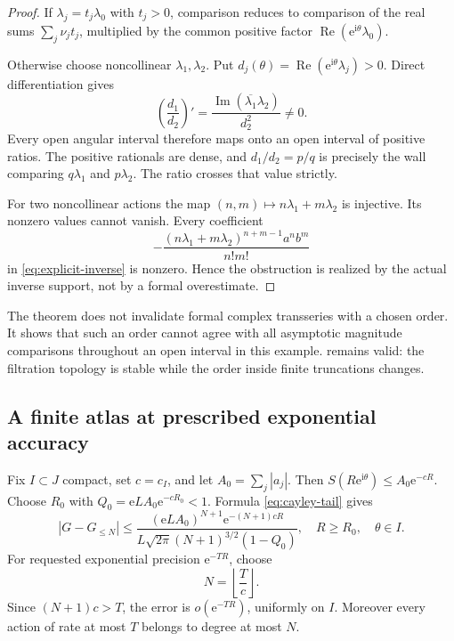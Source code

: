 \documentclass[11pt,a4paper]{article}
\numberwithin{equation}{section}
\theoremstyle{definition}
\theoremstyle{remark}
\newcommand{\ii}{\mathrm i}
\newcommand{\e}{\mathrm e}
\newcommand{\Rea}{\operatorname{Re}}
\newcommand{\Ima}{\operatorname{Im}}
\begin{document}
\begin{proof}
If $\lambda_j=t_j\lambda_0$ with $t_j>0$, comparison reduces to comparison
of the real sums $\sum_j\nu_jt_j$, multiplied by the common positive
factor $\Rea(\e^{\ii\theta}\lambda_0)$.

Otherwise choose noncollinear $\lambda_1,\lambda_2$. Put
$d_j(\theta)=\Rea(\e^{\ii\theta}\lambda_j)>0$. Direct differentiation gives
\begin{equation}\label{eq:ratio-derivative}
 \left(\frac{d_1}{d_2}\right)'=
 \frac{\Ima(\overline{\lambda_1}\lambda_2)}{d_2^2}\ne0.
\end{equation}
Every open angular interval therefore maps onto an open interval of
positive ratios. The positive rationals are dense, and $d_1/d_2=p/q$
is precisely the wall comparing $q\lambda_1$ and $p\lambda_2$.
The ratio crosses that value strictly.

For two noncollinear actions the map $(n,m)\mapsto n\lambda_1+m\lambda_2$
is injective. Its nonzero values cannot vanish. Every coefficient
\[
 -\frac{(n\lambda_1+m\lambda_2)^{n+m-1}a^n b^m}{n!m!}
\]
in \eqref{eq:explicit-inverse} is nonzero. Hence the obstruction is
realized by the actual inverse support, not by a formal overestimate.
\end{proof}

The theorem does not invalidate formal complex transseries with a chosen
order. It shows that such an order cannot agree with all asymptotic
magnitude comparisons throughout an open interval in this example.
 remains valid: the filtration topology is stable
while the order inside finite truncations changes.

\subsection{A finite atlas at prescribed exponential accuracy}

Fix $I\subset J$ compact, set $c=c_I$, and let $A_0=\sum_j|a_j|$.
Then $S(R\e^{\ii\theta})\le A_0\e^{-cR}$. Choose $R_0$ with
$Q_0=\e L A_0\e^{-cR_0}<1$. Formula \eqref{eq:cayley-tail} gives
\begin{equation}\label{eq:uniform-exp-tail}
 |G-G_{\le N}|\le
 \frac{(\e L A_0)^{N+1}\e^{-(N+1)cR}}
 {L\sqrt{2\pi}(N+1)^{3/2}(1-Q_0)},
 \quad R\ge R_0,\quad\theta\in I.
\end{equation}
For requested exponential precision $\e^{-TR}$, choose
\begin{equation}\label{eq:precision-degree}
 N=\left\lfloor\frac{T}{c}\right\rfloor.
\end{equation}
Since $(N+1)c>T$, the error is $o(\e^{-TR})$, uniformly on $I$.
Moreover every action of rate at most $T$ belongs to degree at most $N$.
\end{document}
